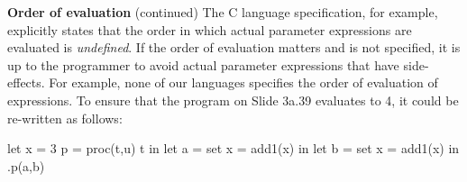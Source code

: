 \begin{minipage}[t]{\sw}
\slidenumber
\LARGE
{\bf Order of evaluation} (continued)\exx
The C language specification, for example,
explicitly states that the order
in which actual parameter expressions are evaluated is {\em undefined}.
If the order of evaluation matters and is not specified,
it is up to the programmer to
avoid actual parameter expressions that have side-effects.
For example, none of our languages specifies
the order of evaluation of expressions.
To ensure that the program on Slide 3a.39 evaluates to 4,
it could be re-written as follows:
\begin{qv}
let
  x = 3
  p = proc(t,u) t
in
  let a = {set x = add1(x)}
  in
    let b = {set x = add1(x)}
    in 
      .p(a,b)
\end{qv}
\end{minipage}
\clearpage
